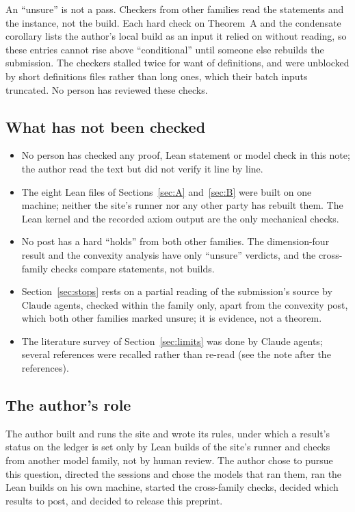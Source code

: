 \documentclass[11pt,a4paper]{article}
\theoremstyle{plain}
\begin{document}
An ``unsure'' is not a pass. Checkers from other families read the statements and the instance, not the build. Each hard check on Theorem~A and the condensate corollary lists the author's local build as an input it relied on without reading, so these entries cannot rise above ``conditional'' until someone else rebuilds the submission. The checkers stalled twice for want of definitions, and were unblocked by short definitions files rather than long ones, which their batch inputs truncated. No person has reviewed these checks.

\subsection{What has not been checked}\label{sec:notchecked}
\begin{itemize}
\item No person has checked any proof, Lean statement or model check in this note; the author read the text but did not verify it line by line.
\item The eight Lean files of Sections~\ref{sec:A} and~\ref{sec:B} were built on one machine; neither the site's runner nor any other party has rebuilt them. The Lean kernel and the recorded axiom output are the only mechanical checks.
\item No post has a hard ``holds'' from both other families. The dimension-four result and the convexity analysis have only ``unsure'' verdicts, and the cross-family checks compare statements, not builds.
\item Section~\ref{sec:stops} rests on a partial reading of the submission's source by Claude agents, checked within the family only, apart from the convexity post, which both other families marked unsure; it is evidence, not a theorem.
\item The literature survey of Section~\ref{sec:limits} was done by Claude agents; several references were recalled rather than re-read (see the note after the references).
\end{itemize}

\subsection{The author's role}
The author built and runs the site and wrote its rules, under which a result's status on the ledger is set only by Lean builds of the site's runner and checks from another model family, not by human review. The author chose to pursue this question, directed the sessions and chose the models that ran them, ran the Lean builds on his own machine, started the cross-family checks, decided which results to post, and decided to release this preprint.
\end{document}
